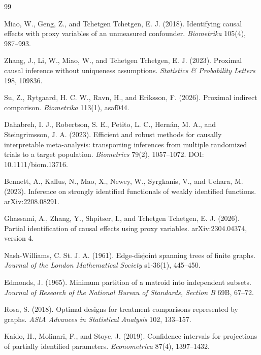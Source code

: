 \documentclass{article}
\begin{document}
\begin{thebibliography}{99}

   Miao, W., Geng, Z., and Tchetgen Tchetgen, E. J. (2018). Identifying causal effects with proxy variables of an unmeasured confounder. \emph{Biometrika} 105(4), 987--993.

   Zhang, J., Li, W., Miao, W., and Tchetgen Tchetgen, E. J. (2023). Proximal causal inference without uniqueness assumptions. \emph{Statistics \& Probability Letters} 198, 109836.

   Su, Z., Rytgaard, H. C. W., Ravn, H., and Eriksson, F. (2026). Proximal indirect comparison. \emph{Biometrika} 113(1), asaf044.

   Dahabreh, I. J., Robertson, S. E., Petito, L. C., Hernán, M. A., and Steingrimsson, J. A. (2023). Efficient and robust methods for causally interpretable meta-analysis: transporting inferences from multiple randomized trials to a target population. \emph{Biometrics} 79(2), 1057--1072. DOI: 10.1111/biom.13716.

   Bennett, A., Kallus, N., Mao, X., Newey, W., Syrgkanis, V., and Uehara, M. (2023). Inference on strongly identified functionals of weakly identified functions. arXiv:2208.08291.

   Ghassami, A., Zhang, Y., Shpitser, I., and Tchetgen Tchetgen, E. J. (2026). Partial identification of causal effects using proxy variables. arXiv:2304.04374, version 4.

   Nash-Williams, C. St. J. A. (1961). Edge-disjoint spanning trees of finite graphs. \emph{Journal of the London Mathematical Society} s1-36(1), 445--450.

   Edmonds, J. (1965). Minimum partition of a matroid into independent subsets. \emph{Journal of Research of the National Bureau of Standards, Section B} 69B, 67--72.

   Rosa, S. (2018). Optimal designs for treatment comparisons represented by graphs. \emph{AStA Advances in Statistical Analysis} 102, 133--157.

   Kaido, H., Molinari, F., and Stoye, J. (2019). Confidence intervals for projections of partially identified parameters. \emph{Econometrica} 87(4), 1397--1432.


\end{thebibliography}
\end{document}
